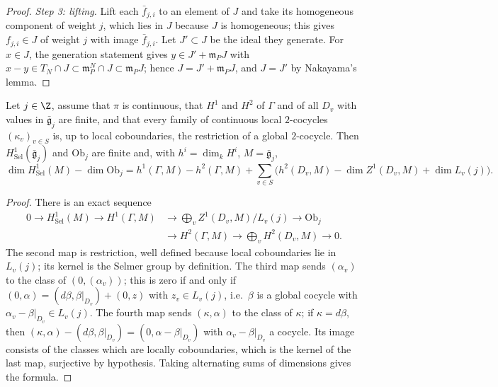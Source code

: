 \begin{proof}
\emph{Step 3: lifting.} Lift each $\bar f_{j,i}$ to an element of $J$ and take its homogeneous component of weight $j$, which lies in $J$
because $J$ is homogeneous; this gives $f_{j,i}\in J$ of weight $j$ with image $\bar f_{j,i}$. Let $J'\subset J$ be the ideal they generate.
For $x\in J$, the generation statement gives $y\in J'+\mathfrak m_PJ$ with $x-y\in T_N\cap J\subset\mathfrak m_P^N\cap J\subset\mathfrak m_PJ$; hence
$J=J'+\mathfrak m_PJ$, and $J=J'$ by Nakayama's lemma.
\end{proof}

\begin{lemma}\label{pf:eis:ecsel}
Let $j\in\Z$, assume that $\pi$ is continuous, that $H^1$ and $H^2$ of $\Gamma$ and of all $D_v$ with values in $\bar{\mathfrak g}_j$ are finite, and
that every family of continuous local $2$-cocycles $(\kappa_v)_{v\in S}$ is, up to local coboundaries, the restriction of a global
$2$-cocycle. Then $H^1_{\mathrm{Sel}}(\bar{\mathfrak g}_j)$ and $\mathrm{Ob}_j$ are finite and, with $h^i=\dim_kH^i$, $M=\bar{\mathfrak g}_j$,
\[
 \dim H^1_{\mathrm{Sel}}(M)-\dim\mathrm{Ob}_j=h^1(\Gamma,M)-h^2(\Gamma,M)+\sum_{v\in S}\bigl(h^2(D_v,M)-\dim Z^1(D_v,M)+\dim L_v(j)\bigr).
\]
\end{lemma}

\begin{proof}
There is an exact sequence
\[
\begin{aligned}
 0\to H^1_{\mathrm{Sel}}(M)\to H^1(\Gamma,M)&\to\bigoplus_vZ^1(D_v,M)/L_v(j)\to\mathrm{Ob}_j\\
 &\to H^2(\Gamma,M)\to\bigoplus_vH^2(D_v,M)\to0.
\end{aligned}
\]
The second map is restriction, well defined because local coboundaries lie in $L_v(j)$; its kernel is the Selmer group by definition.
The third map sends $(\alpha_v)$ to the class of $(0,(\alpha_v))$; this is zero if and only if $(0,\alpha)=(d\beta,\beta|_{D_v})+(0,z)$ with $z_v\in L_v(j)$,
i.e.\ $\beta$ is a global cocycle with $\alpha_v-\beta|_{D_v}\in L_v(j)$. The fourth map sends $(\kappa,\alpha)$ to the class of $\kappa$; if $\kappa=d\beta$,
then $(\kappa,\alpha)-(d\beta,\beta|_{D_v})=(0,\alpha-\beta|_{D_v})$ with $\alpha_v-\beta|_{D_v}$ a cocycle. Its image consists of the classes which are
locally coboundaries, which is the kernel of the last map, surjective by hypothesis. Taking alternating sums of dimensions gives the
formula.
\end{proof}

